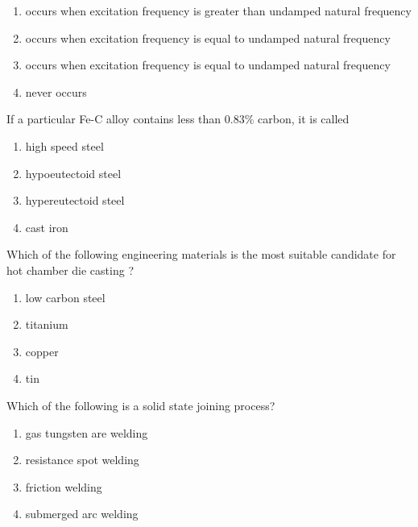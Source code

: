 \begin{enumerate}
        \item occurs when excitation frequency is greater than undamped natural frequency
        \item occurs when excitation frequency is equal to undamped natural frequency
        \item occurs when excitation frequency is equal to undamped natural frequency
        \item never occurs
\end{enumerate}

\bigskip
\item If a particular Fe-C alloy contains less than $ 0.83\% $ carbon, it is called
\begin{multicols}{2}
    \begin{enumerate}
        \item high speed steel
        \item hypoeutectoid steel
        \item hypereutectoid steel
        \item cast iron
    \end{enumerate}
\end{multicols}
\bigskip
\item Which of the following engineering materials is the most suitable candidate for hot chamber die casting ?
\begin{multicols}{2}
    \begin{enumerate}
        \item low carbon steel 
        \item titanium 
        \item copper 
        \item tin
    \end{enumerate}
\end{multicols}
\bigskip
\item Which of the following is a solid state joining  process?
\begin{multicols}{2}
    \begin{enumerate}
        \item gas tungsten are welding
        \item resistance spot welding
        \item friction welding 
        \item submerged arc welding 
    \end{enumerate}
\end{multicols}


